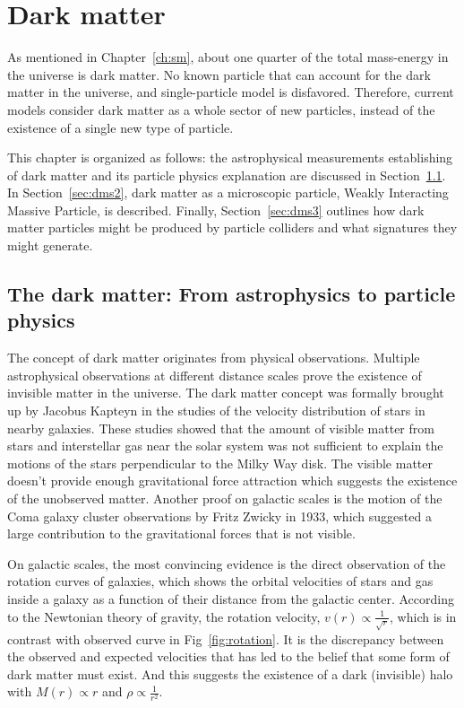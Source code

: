 \chapter{Dark matter}
\label{ch:dm}
\par As mentioned in Chapter~\ref{ch:sm}, about one quarter of the total mass-energy in the universe is dark matter. No known particle that can account for the dark matter in the universe, and single-particle model is disfavored. Therefore, current models consider dark matter as a whole sector of new particles, instead of the existence of a single new type of particle.

\par This chapter is organized as follows: the astrophysical measurements establishing of dark matter and its particle physics explanation are discussed in Section~\ref{sec:dms1}. In Section~\ref{sec:dms2}, dark matter as a microscopic particle, Weakly Interacting Massive Particle, is described. Finally, Section~\ref{sec:dms3} outlines how dark matter particles might be produced by particle colliders and what signatures they might generate.

\section{The dark matter: From astrophysics to particle physics}
\label{sec:dms1}

\par The concept of dark matter originates from physical observations. Multiple astrophysical observations at different distance scales prove the existence of invisible matter in the universe. The dark matter concept was formally brought up by Jacobus Kapteyn in the studies of the velocity distribution of stars in nearby galaxies\cite{Kapteyn:1922zz}. These studies showed that the amount of visible matter from stars and interstellar gas near the solar system was not sufficient to explain the motions of the stars perpendicular to the Milky Way disk. The visible matter doesn't provide enough gravitational force attraction which suggests the existence of the unobserved matter. Another proof on galactic scales is the motion of the Coma galaxy cluster observations by Fritz Zwicky in 1933\cite{Zwicky:1933gu}, which suggested a large contribution to the gravitational forces that is not visible.

\par On galactic scales, the most convincing evidence is the direct observation of the rotation curves of galaxies, which shows the orbital velocities of stars and gas inside a galaxy as a function of their distance from the galactic center. According to the Newtonian theory of gravity, the rotation velocity, $v(r) \propto \frac{1}{\sqrt{r}}$, which is in contrast with observed curve in Fig~\ref{fig:rotation}. It is the discrepancy between the observed and expected velocities that has led to the belief that some form of dark matter must exist. And this suggests the existence of a dark (invisible) halo with $M(r) \propto r$ and $\rho \propto \frac{1}{r^2}$.


